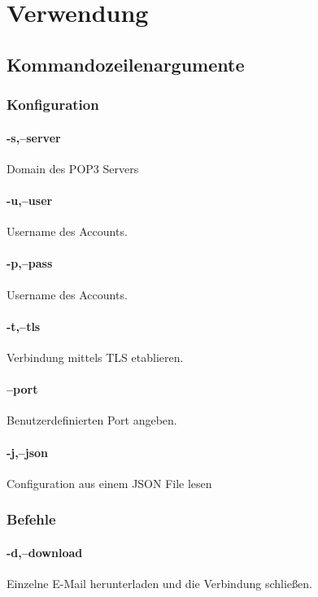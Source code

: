 \documentclass[12pt, letterpaper]{article}
\begin{document}
\section{Verwendung}
\label{usage}

\subsection{Kommandozeilenargumente}

\subsubsection{Konfiguration}
\paragraph{-s,--server}
Domain des POP3 Servers

\paragraph{-u,--user}
Username des Accounts.

\paragraph{-p,--pass}
Username des Accounts.

\paragraph{-t,--tls}
Verbindung mittels TLS etablieren.

\paragraph{--port}
Benutzerdefinierten Port angeben.

\paragraph{-j,--json}
Configuration aus einem JSON File lesen

\subsubsection{Befehle}
\label{commands_lab}
\paragraph{-d,--download}
Einzelne E-Mail herunterladen und die Verbindung schließen.
\end{document}
